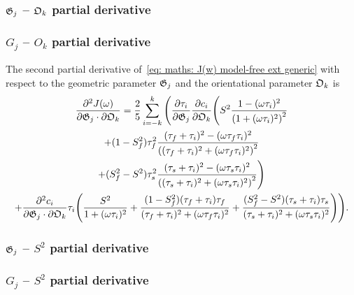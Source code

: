 \begin{latexonly}
    \subsubsection{$\mathfrak{G}_j$ -- $\mathfrak{O}_k$ partial derivative}
\end{latexonly}
\begin{htmlonly}
    \subsubsection{$G_j$ -- $O_k$ partial derivative}
\end{htmlonly}

The second partial derivative of~\eqref{eq: maths: J(w) model-free ext generic} with respect to the geometric parameter $\mathfrak{G}_j$ and the orientational parameter $\mathfrak{O}_k$ is
\begin{multline}
    \frac{\partial^2 J(\omega)}{\partial \mathfrak{G}_j \cdot \partial \mathfrak{O}_k} = \frac{2}{5} \sum_{i=-k}^k \Bigg(
        \frac{\partial \tau_i}{\partial \mathfrak{G}_j} \frac{\partial c_i}{\partial \mathfrak{O}_k} \Bigg(
            S^2 \frac{1 - (\omega \tau_i)^2}{\left(1 + (\omega \tau_i)^2 \right)^2} \\
            + (1 - S^2_f) \tau_f^2 \frac{(\tau_f + \tau_i)^2 - (\omega \tau_f \tau_i)^2}{\left((\tau_f + \tau_i)^2 + (\omega \tau_f \tau_i)^2 \right)^2} \\
            + (S^2_f - S^2) \tau_s^2 \frac{(\tau_s + \tau_i)^2 - (\omega \tau_s \tau_i)^2}{\left((\tau_s + \tau_i)^2 + (\omega \tau_s \tau_i)^2 \right)^2}
        \Bigg) \\
        +  \frac{\partial^2 c_i}{\partial \mathfrak{G}_j \cdot \partial \mathfrak{O}_k} \tau_i \Bigg(
            \frac{S^2}{1 + (\omega \tau_i)^2}
            + \frac{(1 - S^2_f)(\tau_f + \tau_i)\tau_f}{(\tau_f + \tau_i)^2 + (\omega \tau_f \tau_i)^2}
            + \frac{(S^2_f - S^2)(\tau_s + \tau_i)\tau_s}{(\tau_s + \tau_i)^2 + (\omega \tau_s \tau_i)^2}
        \Bigg)
    \Bigg).
\end{multline}



\begin{latexonly}
    \subsubsection{$\mathfrak{G}_j$ -- $S^2$ partial derivative}
\end{latexonly}
\begin{htmlonly}
    \subsubsection{$G_j$ -- $S^2$ partial derivative}
\end{htmlonly}

